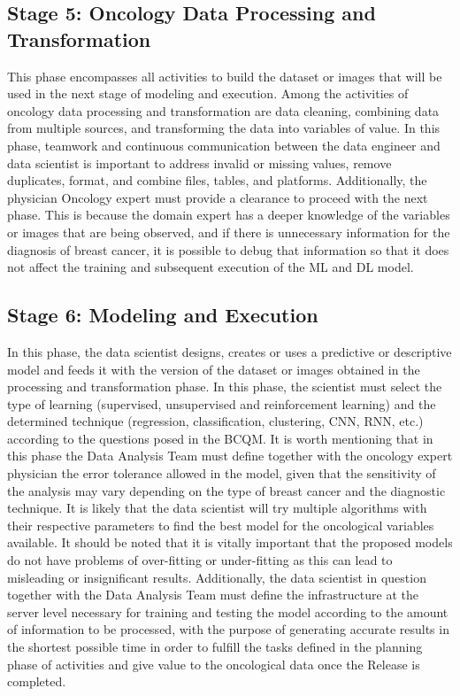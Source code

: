 \subsection*{Stage 5: Oncology Data Processing and Transformation }
This phase encompasses all activities to build the dataset or images that will be used in the next stage of modeling and execution. Among the activities of oncology data processing and transformation are data cleaning, combining data from multiple sources, and transforming the data into variables of value. In this phase, teamwork and continuous communication between the data engineer and data scientist is important to address invalid or missing values, remove duplicates, format, and combine files, tables, and platforms. Additionally, the physician Oncology expert must provide a clearance to proceed with the next phase. This is because the domain expert has a deeper knowledge of the variables or images that are being observed, and if there is unnecessary information for the diagnosis of breast cancer, it is possible to debug that information so that it does not affect the training and subsequent execution of the ML and DL model.

\subsection*{Stage 6: Modeling and Execution}
In this phase, the data scientist designs, creates or uses a predictive or descriptive model and feeds it with the version of the dataset or images obtained in the processing and transformation phase. In this phase, the scientist must select the type of learning (supervised, unsupervised and reinforcement learning) and the determined technique (regression, classification, clustering, CNN, RNN, etc.) according to the questions posed in the BCQM. It is worth mentioning that in this phase the Data Analysis Team must define together with the oncology expert physician the error tolerance allowed in the model, given that the sensitivity of the analysis may vary depending on the type of breast cancer and the diagnostic technique. It is likely that the data scientist will try multiple algorithms with their respective parameters to find the best model for the oncological variables available. It should be noted that it is vitally important that the proposed models do not have problems of over-fitting or under-fitting as this can lead to misleading or insignificant results. Additionally, the data scientist in question together with the Data Analysis Team must define the infrastructure at the server level necessary for training and testing the model according to the amount of information to be processed, with the purpose of generating accurate results in the shortest possible time in order to fulfill the tasks defined in the planning phase of activities and give value to the oncological data once the Release is completed.

